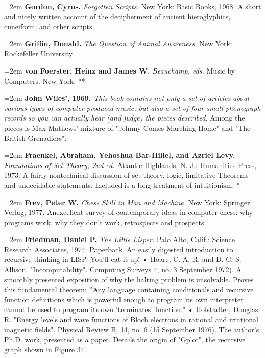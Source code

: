 \par\noindent\hangindent=2em {\bf Gordon, Cyrus.} {\it Forgotten Scripts.} New York: Basic Books, 1968. A short and nicely written account of the decipherment of ancient hieroglyphics, cuneiform, and other scripts.

\par\noindent\hangindent=2em {\bf Griffin, Donald.} {\it The Question of Animal Awareness.} New York: Rockefeller University

\par\noindent\hangindent=2em {\bf von Foerster, Heinz and James W.} {\it Beauchamp, eds.} Music by Computers. New York: **

\par\noindent\hangindent=2em {\bf John Wiles', 1969.} {\it This book contains not only a set of articles about various types of computer-produced music, but also a set of four small phonograph records so you can actually hear (and judge) the pieces described.} Among the pieces is Max Mathews' mixture of "Johnny Comes Marching Home" and "The British Grenadiers".

\par\noindent\hangindent=2em {\bf Fraenkel, Abraham, Yehoshua Bar-Hillel, and Azriel Levy.} {\it Foundations of Set Theory, 2nd ed.} Atlantic Highlands, N. J.: Humanities Press, 1973. A fairly nontechnical discussion of set theory, logic, limitative Theorems and undecidable statements. Included is a long treatment of intuitionism. *

\par\noindent\hangindent=2em {\bf Frev, Peter W.} {\it Chess Skill in Man and Machine.} New York: Springer Verlag, 1977. Anexcellent survey of contemporary ideas in computer chess: why programs work, why they don't work, retrospects and prospects.

\par\noindent\hangindent=2em {\bf Friedman, Daniel P.} {\it The Little Lisper.} Palo Alto, Calif.: Science Research Associates, 1974. Paperback. An easily digested introduction to recursive thinking in LISP. You'll eat it up! • Hoare, C. A. R, and D. C. S. Allison. "Incomputability". Computing Surveys 4, no. 3 September 1972). A smoothly presented exposition of why the halting problem is unsolvable. Proves this fundamental theorem: ''Any language containing conditionals and recursive function definitions which is powerful enough to program its own interpreter cannot be used to program its own 'terminates' function." • Hofstadter, Douglas R. "Energy levels and wave functions of Bloch electrons in rational and irrational magnetic fields". Physical Review B, 14, no. 6 (15 September 1976). The author's Ph.D. work, presented as a paper. Details the origin of "Gplot", the recursive graph shown in Figure 34.

